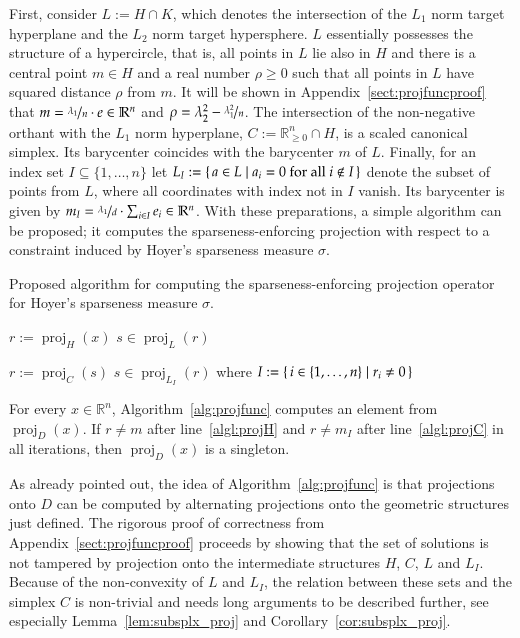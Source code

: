 \documentclass[twoside,11pt]{article}
\DeclareMathOperator{\proj}{proj}
\newcommand{\R}{\mathbb{R}}
\newcommand{\0}{\mathcal{O}}
\newcommand{\discint}[2]{\{#1,\dotsc,#2\}}
\newcommand{\inint}[2]{\in\discint{#1}{#2}}
\begin{document}
First, consider $L := H\cap K$, which denotes the intersection of the $L_1$ norm target hyperplane and the $L_2$ norm target hypersphere.
$L$ essentially possesses the structure of a hypercircle, that is, all points in $L$ lie also in $H$ and there is a central point $m\in H$ and a real number $\rho\geq 0$ such that all points in $L$ have squared distance $\rho$ from $m$.
It will be shown in Appendix~\ref{sect:projfuncproof} that $m = \nicefrac{\lambda_1}{n}\cdot e\in\R^n$ and $\rho = \lambda_2^2 - \nicefrac{\lambda_1^2}{n}$.
The intersection of the non-negative orthant with the $L_1$ norm hyperplane, $C := \R_{\geq 0}^n\cap H$, is a scaled canonical simplex.
Its barycenter coincides with the barycenter $m$ of $L$.
Finally, for an index set $I\subseteq\discint{1}{n}$ let $L_I := \set{a\in L | a_i = 0\text{ for all }i\not\in I}$ denote the subset of points from $L$, where all coordinates with index not in $I$ vanish.
Its barycenter is given by $m_I = \nicefrac{\lambda_1}{d}\cdot\sum_{i\in I}e_i\in\R^n$.
With these preparations, a simple algorithm can be proposed; it computes the sparseness-enforcing projection with respect to a constraint induced by Hoyer's sparseness measure $\sigma$.
\begin{algorithm}[t]
  \caption{Proposed algorithm for computing the sparseness-enforcing projection operator for Hoyer's sparseness measure $\sigma$.}
  \label{alg:projfunc}
  \SetAlgoLined
  \KwIn{$x\in\R^n$ and $\lambda_1,\lambda_2\in\R_{> 0}$ with $\lambda_2 \leq \lambda_1 \leq \sqrt{n}\lambda_2$.}
  \KwOut{$s\in\proj_D(x)$ where $D = S_{\geq 0}^{(\lambda_1,\lambda_2)}$.}
  \BlankLine

  $r := \proj_H(x)$\;
  $s \in \proj_L(r)$\;

  \While{$s\not\in\R_{\geq 0}^n$}
  {
    $r := \proj_C(s)$\;
    $s \in \proj_{L_I}(r)$ where $I := \set{i\inint{1}{n} | r_i \neq 0}$\;
  }
\end{algorithm}
\begin{theorem}
\label{thm:projfunc}
For every $x\in\R^n$, Algorithm~\ref{alg:projfunc} computes an element from $\proj_D(x)$.
If $r\neq m$ after line~\ref{algl:projH} and $r\neq m_I$ after line~\ref{algl:projC} in all iterations, then $\proj_D(x)$ is a singleton.
\end{theorem}
As already pointed out, the idea of Algorithm~\ref{alg:projfunc} is that projections onto $D$ can be computed by alternating projections onto the geometric structures just defined.
The rigorous proof of correctness from Appendix~\ref{sect:projfuncproof} proceeds by showing that the set of solutions is not tampered by projection onto the intermediate structures $H$, $C$, $L$ and $L_I$.
Because of the non-convexity of $L$ and $L_I$, the relation between these sets and the simplex $C$ is non-trivial and needs long arguments to be described further, see especially Lemma~\ref{lem:subsplx_proj} and Corollary~\ref{cor:subsplx_proj}.
\end{document}
